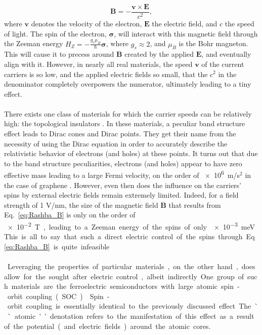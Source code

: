 \begin{equation}
	\label{eq:Rashba_B}
	\bm{B} = - \frac{\bm v \times \bm E}{c^2},
\end{equation}
where $\bm v$ denotes the velocity of the electron, $\bm E$ the electric field, and $c$ the speed of light.
The spin of the electron, $\bm{\sigma}$, will interact with this magnetic field through the Zeeman energy $H_Z = -\frac{g_s\mu_B}{\hbar} \bm{\sigma}$, where $g_s \approx 2$, and $\mu_B$ is the Bohr magneton.
This will cause it to precess around $\bm B$ created by the applied $\bm E$, and eventually align with it.
However, in nearly all real materials, the speed $\bm v$ of the current carriers is so low, and the applied electric fields so small, that the $c^2$ in the denominator completely overpowers the numerator, ultimately leading to a tiny effect.
\\\\
There exists one class of materials for which the carrier speeds can be relatively high: the topological insulators \cite{Kane2005a,Novoselov2005,CastroNeto2009,Fu2007,Fu2006,Pesin2012}.
In these materials, a peculiar band structure effect leads to Dirac cones and Dirac points. They get their name from the necessity of using the Dirac equation in order to accurately describe the relativistic behavior of electrons (and holes) at these points.
It turns out that due to the band structure peculiarities, electrons (and holes) appear to have zero effective mass leading to a large Fermi velocity, on the order of \SI{e6}m/s$^2$ in the case of graphene \cite{Novoselov2005}.   
However, even then does the influence on the carriers' spins by external electric fields remain extremely limited.
Indeed, for a field strength of 1 V/nm, the size of the magnetic field $\bm B$ that results from Eq.~\eqref{eq:Rashba_B} is only on the order of \SI{e-2} T, leading to a Zeeman energy of the spins of only \SI{e-3} meV.
This is all to say that such a direct electric control of the spins through Eq.~\eqref{eq:Rashba_B} is quite infeasible.
\\\\
Leveraging the properties of particular materials, on the other hand, does allow for the sought after electric control, albeit indirectly.
One group of such materials are the ferroelectric semiconductors with large atomic spin-orbit coupling (SOC) \cite{Picozzi2014,DiSante2013,Ishizaka2011,Kim2014}.
Spin-orbit coupling is essentially identical to the previously discussed effect.
The ``atomic'' denotation refers to the manifestation of this effect as a result of the potential (and electric fields) around the atomic cores.
